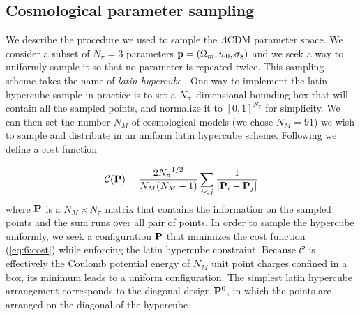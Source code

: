 \subsection{Cosmological parameter sampling}
\label{sec:6:sampling}
We describe the procedure we used to sample the $\Lambda$CDM parameter space. We consider a subset of $N_\pi=3$ parameters $\mathbf{p}=(\Omega_m,w_0,\sigma_8)$ and we seek a way to uniformly sample it so that no parameter is repeated twice. This sampling scheme takes the name of \textit{latin hypercube} \citep{Coyote2}. One way to implement the latin hypercube sample in practice is to set a $N_\pi$--dimensional bounding box that will contain all the sampled points, and normalize it to $[0,1]^{N_\pi}$ for simplicity. We can then set the number $N_M$ of cosmological models (we chose $N_M=91$) we wish to sample and distribute in an uniform latin hypercube scheme. Following \citep{Coyote2,PetriCFHTMink} we define a cost function 

\begin{equation}
\label{eq:6:cost}
\mathcal{C}(\mathbf{P}) = \frac{2{N_\pi}^{1/2}}{N_M(N_M-1)}\sum_{i<j} \frac{1}{\vert \mathbf{P}_i-\mathbf{P}_j \vert}
\end{equation} 
%
where $\mathbf{P}$ is a $N_M\times N_\pi$ matrix that contains the information on the sampled points and the sum runs over all pair of points. In order to sample the hypercube uniformly, we seek a configuration $\mathbf{P}$ that minimizes the cost function (\ref{eq:6:cost}) while enforcing the latin hypercube constraint. Because $\mathcal{C}$ is effectively the Coulomb potential energy of $N_M$ unit point charges confined in a box, its minimum leads to a uniform configuration. The simplest latin hypercube arrangement corresponds to the diagonal design $\mathbf{P}^0$, in which the points are arranged on the diagonal of the hypercube

